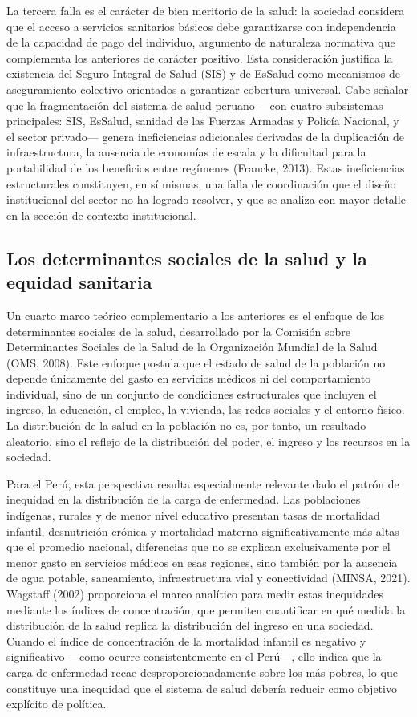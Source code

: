\documentclass[12pt]{article}
\begin{document}
La tercera falla es el carácter de bien meritorio de la salud: la sociedad considera que el acceso a
servicios sanitarios básicos debe garantizarse con independencia de la capacidad de pago del
individuo, argumento de naturaleza normativa que complementa los anteriores de carácter positivo.
Esta consideración justifica la existencia del Seguro Integral de Salud (SIS) y de EsSalud como
mecanismos de aseguramiento colectivo orientados a garantizar cobertura universal. Cabe señalar
que la fragmentación del sistema de salud peruano ---con cuatro subsistemas principales: SIS,
EsSalud, sanidad de las Fuerzas Armadas y Policía Nacional, y el sector privado--- genera
ineficiencias adicionales derivadas de la duplicación de infraestructura, la ausencia de economías
de escala y la dificultad para la portabilidad de los beneficios entre regímenes (Francke, 2013).
Estas ineficiencias estructurales constituyen, en sí mismas, una falla de coordinación que el diseño
institucional del sector no ha logrado resolver, y que se analiza con mayor detalle en la sección de
contexto institucional.

\subsection{Los determinantes sociales de la salud y la equidad sanitaria}

Un cuarto marco teórico complementario a los anteriores es el enfoque de los determinantes
sociales de la salud, desarrollado por la Comisión sobre Determinantes Sociales de la Salud de la
Organización Mundial de la Salud (OMS, 2008). Este enfoque postula que el estado de salud de la
población no depende únicamente del gasto en servicios médicos ni del comportamiento individual,
sino de un conjunto de condiciones estructurales que incluyen el ingreso, la educación, el empleo,
la vivienda, las redes sociales y el entorno físico. La distribución de la salud en la población no es,
por tanto, un resultado aleatorio, sino el reflejo de la distribución del poder, el ingreso y los
recursos en la sociedad.

Para el Perú, esta perspectiva resulta especialmente relevante dado el patrón de inequidad en la
distribución de la carga de enfermedad. Las poblaciones indígenas, rurales y de menor nivel
educativo presentan tasas de mortalidad infantil, desnutrición crónica y mortalidad materna
significativamente más altas que el promedio nacional, diferencias que no se explican
exclusivamente por el menor gasto en servicios médicos en esas regiones, sino también por la
ausencia de agua potable, saneamiento, infraestructura vial y conectividad (MINSA, 2021).
Wagstaff (2002) proporciona el marco analítico para medir estas inequidades mediante los índices
de concentración, que permiten cuantificar en qué medida la distribución de la salud replica la
distribución del ingreso en una sociedad. Cuando el índice de concentración de la mortalidad
infantil es negativo y significativo ---como ocurre consistentemente en el Perú---, ello indica que
la carga de enfermedad recae desproporcionadamente sobre los más pobres, lo que constituye una
inequidad que el sistema de salud debería reducir como objetivo explícito de política.
\end{document}
